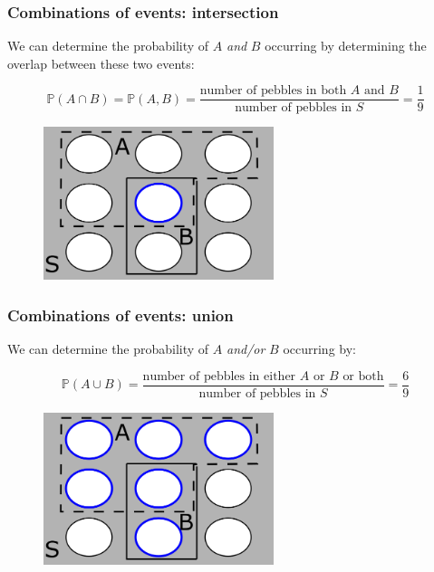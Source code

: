 \documentclass{beamer}
\begin{document}
	\begin{frame}
		\frametitle{Combinations of events: intersection}
		
		We can determine the probability of $A$ \textit{and} $B$ occurring by determining the overlap between these two events:
		
		\begin{equation}
			\mathbb{P}(A \cap  B) = \mathbb{P}(A, B) = \frac{\text{number of pebbles in both } A \text{ and } B}{\text{number of pebbles in } S} = \frac{1}{9}
		\end{equation}
		
		\begin{figure}[ht]
			\centerline{\includegraphics[width=0.6\textwidth]{./figures/pebble_world_and.png}}
		\end{figure}
		
	\end{frame}

	\begin{frame}
		\frametitle{Combinations of events: union}
		
		We can determine the probability of $A$ \textit{and/or} $B$ occurring by:
		
		\begin{equation}
			\mathbb{P}(A \cup B) = \frac{\text{number of pebbles in either } A \text{ or } B \text{ or both}}{\text{number of pebbles in } S} = \frac{6}{9}
		\end{equation}
	
	\begin{figure}[ht]
		\centerline{\includegraphics[width=0.6\textwidth]{./figures/pebble_world_or.png}}
	\end{figure}
		
	\end{frame}
\end{document}
